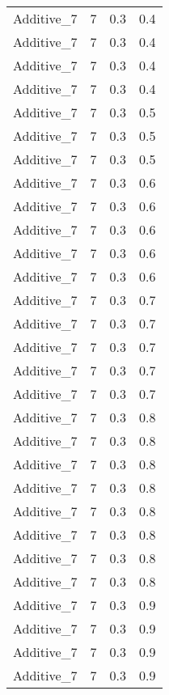\documentclass{article}
\begin{document}
\begin{longtable}[H]{lrrr}
 Additive\_7 &       7 &   0.3 &            0.4 \\
 Additive\_7 &       7 &   0.3 &            0.4 \\
 Additive\_7 &       7 &   0.3 &            0.4 \\
 Additive\_7 &       7 &   0.3 &            0.4 \\
 Additive\_7 &       7 &   0.3 &            0.5 \\
 Additive\_7 &       7 &   0.3 &            0.5 \\
 Additive\_7 &       7 &   0.3 &            0.5 \\
 Additive\_7 &       7 &   0.3 &            0.6 \\
 Additive\_7 &       7 &   0.3 &            0.6 \\
 Additive\_7 &       7 &   0.3 &            0.6 \\
 Additive\_7 &       7 &   0.3 &            0.6 \\
 Additive\_7 &       7 &   0.3 &            0.6 \\
 Additive\_7 &       7 &   0.3 &            0.7 \\
 Additive\_7 &       7 &   0.3 &            0.7 \\
 Additive\_7 &       7 &   0.3 &            0.7 \\
 Additive\_7 &       7 &   0.3 &            0.7 \\
 Additive\_7 &       7 &   0.3 &            0.7 \\
 Additive\_7 &       7 &   0.3 &            0.8 \\
 Additive\_7 &       7 &   0.3 &            0.8 \\
 Additive\_7 &       7 &   0.3 &            0.8 \\
 Additive\_7 &       7 &   0.3 &            0.8 \\
 Additive\_7 &       7 &   0.3 &            0.8 \\
 Additive\_7 &       7 &   0.3 &            0.8 \\
 Additive\_7 &       7 &   0.3 &            0.8 \\
 Additive\_7 &       7 &   0.3 &            0.8 \\
 Additive\_7 &       7 &   0.3 &            0.9 \\
 Additive\_7 &       7 &   0.3 &            0.9 \\
 Additive\_7 &       7 &   0.3 &            0.9 \\
 Additive\_7 &       7 &   0.3 &            0.9 \\

\end{longtable}
\end{document}
